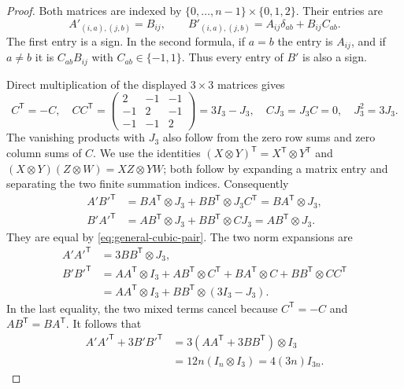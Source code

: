 \documentclass[10pt]{article}
\begin{document}
\begin{proof}
Both matrices are indexed by
$\{0,\ldots,n-1\}\times\{0,1,2\}$. Their entries are
\[
 A'_{(i,a),(j,b)}=B_{ij},\qquad
 B'_{(i,a),(j,b)}=A_{ij}\delta_{ab}+B_{ij}C_{ab}.
\]
The first entry is a sign. In the second formula, if $a=b$ the entry
is $A_{ij}$, and if $a\ne b$ it is $C_{ab}B_{ij}$ with
$C_{ab}\in\{-1,1\}$. Thus every entry of $B'$ is also a sign.

Direct multiplication of the displayed $3\times3$ matrices gives
\[
 C^{\mathsf T}=-C,\quad
 CC^{\mathsf T}=
 \begin{pmatrix}2&-1&-1\\-1&2&-1\\-1&-1&2\end{pmatrix}
 =3I_3-J_3,\quad
 CJ_3=J_3C=0,\quad J_3^2=3J_3.
\]
The vanishing products with $J_3$ also follow from the zero row sums
and zero column sums of $C$. We use the identities
$(X\otimes Y)^{\mathsf T}=X^{\mathsf T}\otimes Y^{\mathsf T}$ and
$(X\otimes Y)(Z\otimes W)=XZ\otimes YW$; both follow by expanding a
matrix entry and separating the two finite summation indices.
Consequently
\begin{align*}
 A'B'^{\mathsf T}
 &=BA^{\mathsf T}\otimes J_3
    +BB^{\mathsf T}\otimes J_3C^{\mathsf T}
  =BA^{\mathsf T}\otimes J_3,\\
 B'A'^{\mathsf T}
 &=AB^{\mathsf T}\otimes J_3
    +BB^{\mathsf T}\otimes CJ_3
  =AB^{\mathsf T}\otimes J_3.
\end{align*}
They are equal by \eqref{eq:general-cubic-pair}. The two norm
expansions are
\begin{align*}
 A'A'^{\mathsf T}&=3BB^{\mathsf T}\otimes J_3,\\
 B'B'^{\mathsf T}
 &=AA^{\mathsf T}\otimes I_3
   +AB^{\mathsf T}\otimes C^{\mathsf T}
   +BA^{\mathsf T}\otimes C
   +BB^{\mathsf T}\otimes CC^{\mathsf T}\\
 &=AA^{\mathsf T}\otimes I_3
   +BB^{\mathsf T}\otimes(3I_3-J_3).
\end{align*}
In the last equality, the two mixed terms cancel because
$C^{\mathsf T}=-C$ and $AB^{\mathsf T}=BA^{\mathsf T}$.
It follows that
\begin{align*}
 A'A'^{\mathsf T}+3B'B'^{\mathsf T}
 &=3(AA^{\mathsf T}+3BB^{\mathsf T})\otimes I_3\\
 &=12n(I_n\otimes I_3)=4(3n)I_{3n}.
\end{align*}
\end{proof}
\end{document}
